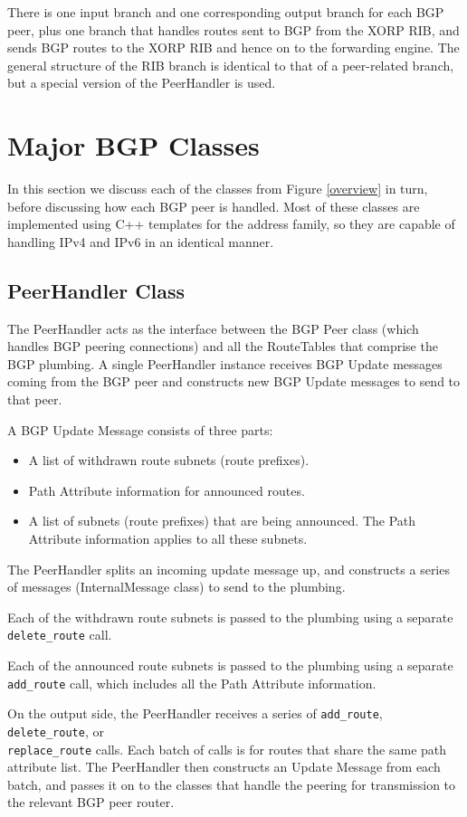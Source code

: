 \documentclass[11pt]{article}
\begin{document}
There is one input branch and one corresponding output branch for each
BGP peer, plus one branch that handles routes sent to BGP from the
XORP RIB, and sends BGP routes to the XORP RIB and hence on to the
forwarding engine.  The general structure of the RIB branch is
identical to that of a peer-related branch, but a special version of
the PeerHandler is used.

\section{Major BGP Classes}
In this section we discuss each of the classes from Figure \ref{overview} in
turn, before discussing how each BGP peer is handled.  Most of these
classes are implemented using C++ templates for the address family, so
they are capable of handling IPv4 and IPv6 in an identical manner.
\subsection{PeerHandler Class}
The PeerHandler acts as the interface between the BGP Peer class
(which handles BGP peering connections) and all the RouteTables that
comprise the BGP plumbing.  A single PeerHandler instance receives 
BGP Update messages coming from the BGP peer and constructs new BGP
Update messages to send to that peer.

A BGP Update Message consists of three parts:
\begin{itemize}
\item A list of withdrawn route subnets (route prefixes).
\item Path Attribute information for announced routes.
\item A list of subnets (route prefixes) that are being announced.
The Path Attribute information applies to all these subnets.
\end{itemize}

The PeerHandler splits an incoming update message up, and constructs a
series of messages (InternalMessage class) to send to the plumbing.

Each of the withdrawn route subnets is passed to the plumbing using a
separate {\tt delete\_route} call.

Each of the announced route subnets is passed to the plumbing using a
separate {\tt add\_route} call, which includes all the Path Attribute
information.

On the output side, the PeerHandler receives a series of {\tt add\_route},
{\tt delete\_route}, or \\
{\tt replace\_route} calls.  Each batch of calls is for
routes that share the same path attribute list.  The PeerHandler then
constructs an Update Message from each batch, and passes it on to the
classes that handle the peering for transmission to the relevant BGP
peer router. 
\end{document}
